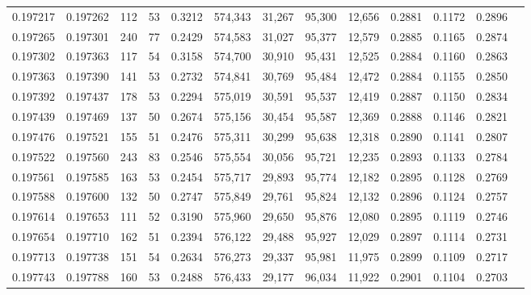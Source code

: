 \begin{tabular}{rrrrrrrrrrrrr}
0.197217 & 0.197262 &   112 &  53 &                                     0.3212 & 574,343 &  31,267 &  95,300 &  12,656 & 0.2881 & 0.1172 & 0.2896 \\
0.197265 & 0.197301 &   240 &  77 &                                     0.2429 & 574,583 &  31,027 &  95,377 &  12,579 & 0.2885 & 0.1165 & 0.2874 \\
0.197302 & 0.197363 &   117 &  54 &                                     0.3158 & 574,700 &  30,910 &  95,431 &  12,525 & 0.2884 & 0.1160 & 0.2863 \\
0.197363 & 0.197390 &   141 &  53 &                                     0.2732 & 574,841 &  30,769 &  95,484 &  12,472 & 0.2884 & 0.1155 & 0.2850 \\
0.197392 & 0.197437 &   178 &  53 &                                     0.2294 & 575,019 &  30,591 &  95,537 &  12,419 & 0.2887 & 0.1150 & 0.2834 \\
0.197439 & 0.197469 &   137 &  50 &                                     0.2674 & 575,156 &  30,454 &  95,587 &  12,369 & 0.2888 & 0.1146 & 0.2821 \\
0.197476 & 0.197521 &   155 &  51 &                                     0.2476 & 575,311 &  30,299 &  95,638 &  12,318 & 0.2890 & 0.1141 & 0.2807 \\
0.197522 & 0.197560 &   243 &  83 &                                     0.2546 & 575,554 &  30,056 &  95,721 &  12,235 & 0.2893 & 0.1133 & 0.2784 \\
0.197561 & 0.197585 &   163 &  53 &                                     0.2454 & 575,717 &  29,893 &  95,774 &  12,182 & 0.2895 & 0.1128 & 0.2769 \\
0.197588 & 0.197600 &   132 &  50 &                                     0.2747 & 575,849 &  29,761 &  95,824 &  12,132 & 0.2896 & 0.1124 & 0.2757 \\
0.197614 & 0.197653 &   111 &  52 &                                     0.3190 & 575,960 &  29,650 &  95,876 &  12,080 & 0.2895 & 0.1119 & 0.2746 \\
0.197654 & 0.197710 &   162 &  51 &                                     0.2394 & 576,122 &  29,488 &  95,927 &  12,029 & 0.2897 & 0.1114 & 0.2731 \\
0.197713 & 0.197738 &   151 &  54 &                                     0.2634 & 576,273 &  29,337 &  95,981 &  11,975 & 0.2899 & 0.1109 & 0.2717 \\
0.197743 & 0.197788 &   160 &  53 &                                     0.2488 & 576,433 &  29,177 &  96,034 &  11,922 & 0.2901 & 0.1104 & 0.2703 \\

\end{tabular}

